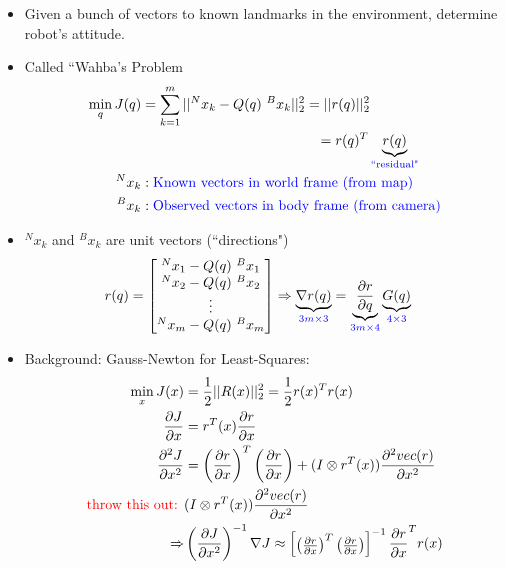 \documentclass[11pt]{article}
\begin{document}
\begin{itemize}
    \item Given a bunch of vectors to known landmarks in the environment, determine robot's attitude.
    \item Called ``Wahba's Problem
    \begin{align*}
        \min_q J(q) &= \sum_{k=1}^m ||{^Nx_k} - Q(q) \ ^Bx_k||_2^2 = ||r(q)||_2^2
        \\
        & \hspace{44mm}=r(q)^T\underbrace{r(q)}_{\textcolor{blue}{\text{``residual"}}}
        \\
        ^Nx_k&: \textcolor{blue}{\text{Known vectors in world frame (from map)}}
        \\
        ^Bx_k&: \textcolor{blue}{\text{Observed vectors in body frame (from camera)}}
    \end{align*}
    \item $^Nx_k$ and $^Bx_k$ are unit vectors (``directions")
    \begin{align*}
        r(q) &= 
        \begin{bmatrix}
            ^Nx_1 - Q(q) \ ^Bx_1 \\
            ^Nx_2 - Q(q) \ ^Bx_2 \\
            \vdots \\
            ^Nx_m - Q(q) \ ^Bx_m \\
        \end{bmatrix}
        \Rightarrow \underbrace{\nabla r(q)}_{\textcolor{blue}{3m\times3}} = \underbrace{\frac{\partial r}{\partial q}}_{\textcolor{blue}{3m\times 4}}\underbrace{G(q)}_{\textcolor{blue}{4\times3}}
    \end{align*}
    \item Background: Gauss-Newton for Least-Squares:
    \begin{align*}
        \min_x J(x) &= \frac{1}{2}||R(x)||_2^2 = \frac{1}{2}r(x)^Tr(x)
        \\
        \frac{\partial J}{\partial x} &= r^T(x)\frac{\partial r}{\partial x}
        \\
        \frac{\partial^2 J}{\partial x^2} &= \left(\frac{\partial r}{\partial x}\right)^T\left(\frac{\partial r}{\partial x}\right) + (I\otimes r^T(x))\frac{\partial^2 vec(r)}{\partial x^2}
        \\
        \textcolor{red}{\text{throw this out: }}& (I\otimes r^T(x))\frac{\partial^2 vec(r)}{\partial x^2}
        \\
        \Rightarrow& \left(\frac{\partial J}{\partial x^2}\right)^{-1}\nabla J \approx \begin{bmatrix}
            \left(\frac{\partial r}{\partial x}\right)^T\left(\frac{\partial r}{\partial x}\right)
        \end{bmatrix}^{-1}
        \frac{\partial r}{\partial x}^T r(x)
    \end{align*}
\end{itemize}
\end{document}
